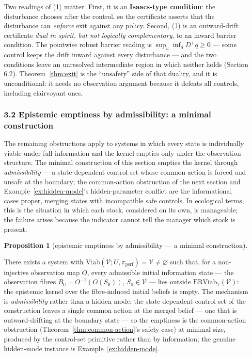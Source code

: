 \documentclass[11pt]{article}
\theoremstyle{definition}
\newtheorem{proposition}{Proposition}
\begin{document}
Two readings of (1) matter. First, it is an \textbf{Isaacs-type
condition}: the disturbance chooses after the control, so the
certificate asserts that the disturbance can \emph{enforce} exit against
any policy. Second, (1) is an outward-drift certificate \emph{dual in
spirit, but not logically complementary}, to an inward barrier
condition. The pointwise robust barrier reading is
\(\sup_u \inf_d D^+ q \ge 0\) --- some control keeps the drift inward
against every disturbance --- and the two conditions leave an unresolved
intermediate region in which neither holds (Section 6.2). Theorem~\ref{thm:exit} is
the ``unsafety'' side of that duality, and it is unconditional: it needs
no observation argument because it defeats all controls, including
clairvoyant ones.

\subsubsection{3.2 Epistemic emptiness by admissibility: a minimal
construction}\label{epistemic-emptiness-by-admissibility-a-minimal-construction}

The remaining obstructions apply to systems in which every state is
individually viable under full information and the kernel empties only under the observation structure.
The minimal construction of this section empties the kernel through
\emph{admissibility} --- a state-dependent control set whose common
action is forced and unsafe at the boundary; the common-action
obstruction of the next section and Example~\ref{ex:hidden-mode}'s hidden-parameter
conflict are the informational cases proper, merging states with
incompatible safe controls. In ecological terms, this is the situation
in which each stock, considered on its own, is manageable; the failure
arises because the indicator cannot tell the manager which stock is
present.

\begin{proposition}[epistemic emptiness by admissibility --- a minimal construction]\label{prop:emptiness}

There exists a system with
\(\mathrm{Viab}(\mathcal{V}; U, \pi_{\mathrm{perf}}) = \mathcal{V} \neq \varnothing\)
such that, for a non-injective observation map \(O\), every admissible
initial information state --- the observation fibres
\(B_0 = O^{-1}(O(S_0))\), \(S_0 \in \mathcal{V}\) --- lies outside
\(\mathrm{ERViab}_{\mathcal{I}}(\mathcal{V})\): the epistemic kernel
over the fibre-induced initial beliefs is empty. The mechanism is \emph{admissibility} rather than a hidden mode: the
state-dependent control set of the construction leaves a single common
action at the merged belief --- one that is outward-drifting at the
boundary state --- so the emptiness is the common-action obstruction
(Theorem~\ref{thm:common-action}'s safety case) at minimal size, produced by the control-set primitive rather than by information; the genuine
hidden-mode instance is Example~\ref{ex:hidden-mode}.

\end{proposition}
\end{document}
